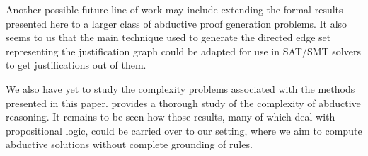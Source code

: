 Another possible future line of work may include extending the formal results
presented here to a larger class of abductive proof generation problems. 
It also seems to us that the main technique used to generate the directed edge
set representing the justification graph could be adapted for use in SAT/SMT
solvers to get justifications out of them. 

We also have yet to study the complexity problems
associated with the methods presented in this paper. \cite{DBLP:journals/tcs/EiterGL97} provides a thorough study 
of the complexity of abductive reasoning. It remains to be seen how those results, 
many of which deal with propositional logic, could be carried over to our setting, where
we aim to compute abductive solutions without complete grounding of rules. %




